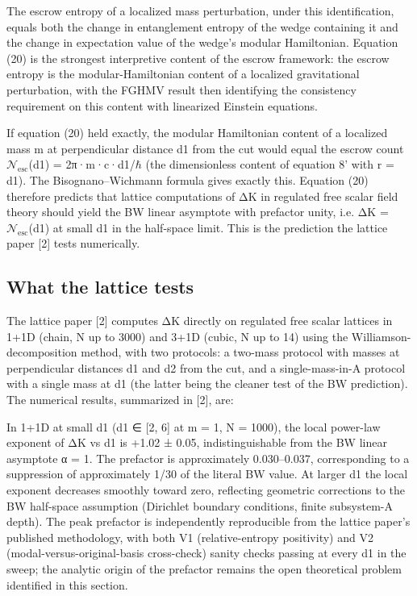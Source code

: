 \documentclass[11pt]{article}
\begin{document}
The escrow entropy of a localized mass perturbation, under this
identification, equals both the change in entanglement entropy of the
wedge containing it and the change in expectation value of the wedge's
modular Hamiltonian. Equation (20) is the strongest interpretive content
of the escrow framework: the escrow entropy is the modular-Hamiltonian
content of a localized gravitational perturbation, with the FGHMV result
then identifying the consistency requirement on this content with
linearized Einstein equations.

If equation (20) held exactly, the modular Hamiltonian content of a
localized mass m at perpendicular distance d1 from the cut would equal
the escrow count $\mathcal{N}_{\mathrm{esc}}$(d1) = 2π·m·c·d1/$\hbar$ (the dimensionless content of
equation 8' with r = d1). The Bisognano--Wichmann formula gives exactly
this. Equation (20) therefore predicts that lattice computations of ΔK
in regulated free scalar field theory should yield the BW linear
asymptote with prefactor unity, i.e. ΔK = $\mathcal{N}_{\mathrm{esc}}$(d1) at small d1 in the
half-space limit. This is the prediction the lattice paper [2] tests
numerically.


\subsection{What the lattice tests}

The lattice paper [2] computes ΔK directly on regulated free scalar
lattices in 1+1D (chain, N up to 3000) and 3+1D (cubic, N up to 14)
using the Williamson-decomposition method, with two protocols: a
two-mass protocol with masses at perpendicular distances d1 and d2 from
the cut, and a single-mass-in-A protocol with a single mass at d1 (the
latter being the cleaner test of the BW prediction). The numerical
results, summarized in [2], are:

In 1+1D at small d1 (d1 ∈ [2, 6] at m = 1, N = 1000), the local
power-law exponent of ΔK vs d1 is +1.02 ± 0.05, indistinguishable from
the BW linear asymptote α = 1. The prefactor is approximately
0.030--0.037, corresponding to a suppression of approximately 1/30 of
the literal BW value. At larger d1 the local exponent decreases smoothly
toward zero, reflecting geometric corrections to the BW half-space
assumption (Dirichlet boundary conditions, finite subsystem-A depth).
The peak prefactor is independently reproducible from the lattice
paper's published methodology, with both V1 (relative-entropy
positivity) and V2 (modal-versus-original-basis cross-check) sanity
checks passing at every d1 in the sweep; the analytic origin of the
prefactor remains the open theoretical problem identified in this
section.
\end{document}
